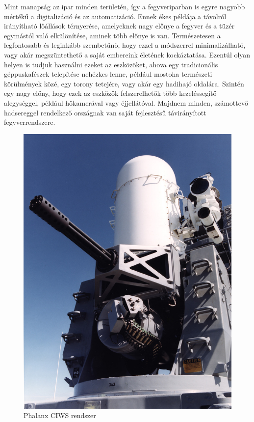 \documentclass[12pt,a4paper]{article}
\begin{document}
\pagebreak

Mint manapság az ipar minden területén, így a fegyveriparban is egyre nagyobb mértékű a digitalizáció és az automatizáció. Ennek ékes példája a távolról irányítható lőállások térnyerése, amelyeknek nagy előnye a fegyver és a tüzér egymástól való elkülönítése, aminek több előnye is van. Természetesen a legfontosabb és leginkább szembetűnő, hogy ezzel a módszerrel minimalizálható, vagy akár megszüntethető a saját embereink életének kockáztatása. Ezentúl olyan helyen is tudjuk használni ezeket az eszközöket, ahova egy tradicionális géppuskafészek telepítése nehézkes lenne, például mostoha természeti körülmények közé, egy torony tetejére, vagy akár egy hadihajó oldalára. Szintén egy nagy előny, hogy ezek az eszközök felszerelhetők több kezeléssegítő alegységgel, például hőkamerával vagy éjjellátóval. Majdnem minden, számottevő hadsereggel rendelkező országnak van saját fejlesztésű távirányított fegyverrendszere.\\


\begin{figure}
	\centering
	\includegraphics[width=0.95\linewidth]{irod_phalanx} 
	\caption{Phalanx CIWS rendszer}
	\label{fig:irod_phalanx}
\end{figure}
\end{document}

